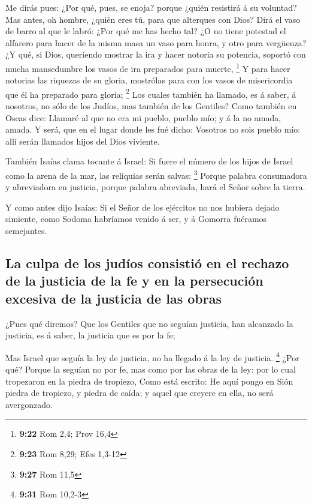  Me dirás pues: ¿Por qué, pues, se enoja? porque ¿quién
resistirá á su voluntad?  Mas antes, oh hombre, ¿quién eres
tú, para que alterques con Dios? Dirá el vaso de barro al que le labró:
¿Por qué me has hecho tal?  ¿O no tiene potestad el
alfarero para hacer de la misma masa un vaso para honra, y otro para
vergüenza?  ¿Y qué, si Dios, queriendo mostrar la ira y
hacer notoria su potencia, soportó con mucha mansedumbre los vasos de
ira preparados para muerte, \footnote{\textbf{9:22} Rom 2,4; Prov 16,4}
 Y para hacer notorias las riquezas de su gloria, mostrólas
para con los vasos de misericordia que él ha preparado para gloria;
\footnote{\textbf{9:23} Rom 8,29; Efes 1,3-12}  Los cuales
también ha llamado, es á saber, á nosotros, no sólo de los Judíos, mas
también de los Gentiles?  Como también en Oseas dice:
Llamaré al que no era mi pueblo, pueblo mío; y á la no amada, amada.
 Y será, que en el lugar donde les fué dicho: Vosotros no
sois pueblo mío: allí serán llamados hijos del Dios viviente.

 También Isaías clama tocante á Israel: Si fuere el número
de los hijos de Israel como la arena de la mar, las reliquias serán
salvas: \footnote{\textbf{9:27} Rom 11,5}  Porque palabra
consumadora y abreviadora en justicia, porque palabra abreviada, hará el
Señor sobre la tierra.

 Y como antes dijo Isaías: Si el Señor de los ejércitos no
nos hubiera dejado simiente, como Sodoma habríamos venido á ser, y á
Gomorra fuéramos semejantes.

\hypertarget{la-culpa-de-los-juduxedos-consistiuxf3-en-el-rechazo-de-la-justicia-de-la-fe-y-en-la-persecuciuxf3n-excesiva-de-la-justicia-de-las-obras}{%
\subsection{La culpa de los judíos consistió en el rechazo de la
justicia de la fe y en la persecución excesiva de la justicia de las
obras}\label{la-culpa-de-los-juduxedos-consistiuxf3-en-el-rechazo-de-la-justicia-de-la-fe-y-en-la-persecuciuxf3n-excesiva-de-la-justicia-de-las-obras}}

 ¿Pues qué diremos? Que los Gentiles que no seguían
justicia, han alcanzado la justicia, es á saber, la justicia que es por
la fe;

 Mas Israel que seguía la ley de justicia, no ha llegado á
la ley de justicia. \footnote{\textbf{9:31} Rom 10,2-3} 
¿Por qué? Porque la seguían no por fe, mas como por las obras de la ley:
por lo cual tropezaron en la piedra de tropiezo,  Como está
escrito: He aquí pongo en Sión piedra de tropiezo, y piedra de caída; y
aquel que creyere en ella, no será avergonzado.

